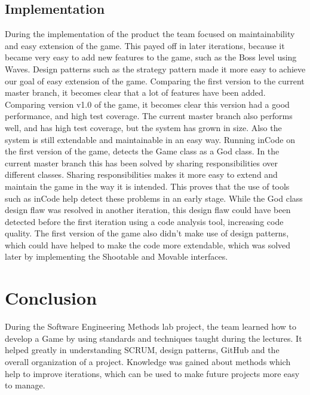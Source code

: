 \documentclass[10pt]{article}
\begin{document}
\subsection*{Implementation}
During the implementation of the product the team focused on maintainability and easy extension of the game. This payed off in later iterations, because it became very easy to add new features to the game, such as the Boss level using Waves. Design patterns such as the strategy pattern made it more easy to achieve our goal of easy extension of the game. Comparing the first version to the current master branch, it becomes clear that a lot of features have been added. 
Comparing version v1.0 of the game, it becomes clear this version had a good performance, and high test coverage. The current master branch also performs well, and has high test coverage, but the system has grown in size. Also the system is still extendable and maintainable in an easy way. Running inCode on the first version of the game, detects the Game class as a God class. In the current master branch this has been solved by sharing responsibilities over different classes. 
Sharing responsibilities makes it more easy to extend and maintain the game in the way it is intended. This proves that the use of tools such as inCode help detect these problems in an early stage. While the God class design flaw was resolved in another iteration, this design flaw could have been detected before the first iteration using a code analysis tool, increasing code quality. The first version of the game also didn't make use of design patterns, which could have helped to make the code more extendable, which was solved later by implementing the Shootable and Movable interfaces.

\newpage
\section*{Conclusion}
During the Software Engineering Methods lab project, the team learned how to develop a Game by using standards and techniques taught during the lectures. It helped greatly in understanding SCRUM, design patterns, GitHub and the overall organization of a project. Knowledge was gained about methods which help to improve iterations, which can be used to make future projects more easy to manage.
\end{document}
